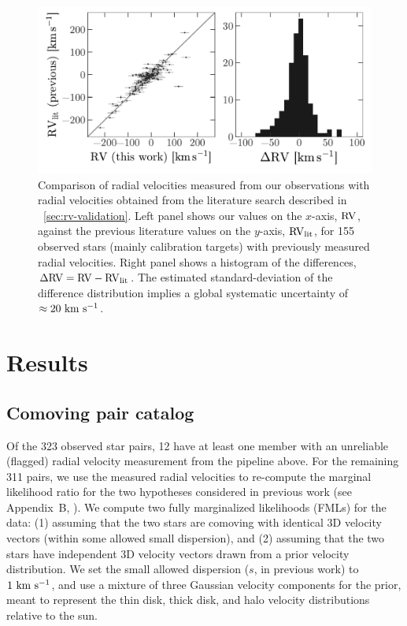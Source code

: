 \documentclass[modern, letterpaper]{aastex61}
\begin{document}
\begin{figure}[htbp]
  \begin{center}
    \includegraphics[width=\linewidth]{rv-comparison.pdf}
  \end{center}
  \caption{%
    Comparison of radial velocities measured from our observations with radial
    velocities obtained from the literature search described in
    \sectionname~\ref{sec:rv-validation}.
    Left panel shows our values on the $x$-axis, ${\rm RV}$, against the
    previous literature values on the $y$-axis, ${\rm RV}_{\rm lit}$, for 155
    observed stars (mainly calibration targets) with previously measured radial
    velocities.
    Right panel shows a histogram of the differences, $\Delta{\rm RV} = {\rm RV}
    - {\rm RV}_{\rm lit}$.
    The estimated standard-deviation of the difference distribution implies a
    global systematic uncertainty of $\approx 20~\mathrm{km}~\mathrm{s}^{-1}$.
    \label{fig:compare-previous}}
\end{figure}

\section{Results} \label{sec:results}

\subsection{Comoving pair catalog}\label{sec:catalog}

Of the 323 observed star pairs, 12 have at least one member with an unreliable
(flagged) radial velocity measurement from the pipeline above.
For the remaining 311 pairs, we use the measured radial velocities to re-compute
the marginal likelihood ratio for the two hypotheses considered in previous work
(see Appendix~B, \citealt{Oh:2017}).
We compute two fully marginalized likelihoods (FMLs) for the data: (1) assuming
that the two stars are comoving with identical 3D velocity vectors (within some
allowed small dispersion), and (2) assuming that the two stars have independent
3D velocity vectors drawn from a prior velocity distribution.
We set the small allowed dispersion ($s$, in previous work) to $1~\mathrm{km}~\mathrm{s}^{-1}$, and use
a mixture of three Gaussian velocity components for the prior, meant to
represent the thin disk, thick disk, and halo velocity distributions relative to
the sun.
\end{document}
